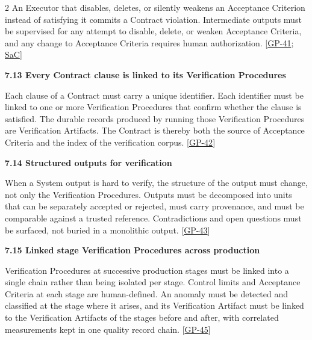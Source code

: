 \begin{multicols}{2}
An Executor that disables, deletes, or silently weakens an Acceptance Criterion instead of satisfying it commits a Contract violation. Intermediate outputs must be supervised for any attempt to disable, delete, or weaken Acceptance Criteria, and any change to Acceptance Criteria requires human authorization. [\hyperlink{gp-41}{GP-41}; \hyperlink{gp-SaC}{SaC}]

\hypertarget{nss-7.13}{}

\par\smallskip\noindent\textbf{7.13 Every Contract clause is linked to its Verification Procedures}\par\nopagebreak

Each clause of a Contract must carry a unique identifier. Each identifier must be linked to one or more Verification Procedures that confirm whether the clause is satisfied. The durable records produced by running those Verification Procedures are Verification Artifacts. The Contract is thereby both the source of Acceptance Criteria and the index of the verification corpus. [\hyperlink{gp-42}{GP-42}]

\hypertarget{nss-7.14}{}

\par\smallskip\noindent\textbf{7.14 Structured outputs for verification}\par\nopagebreak

When a System output is hard to verify, the structure of the output must change, not only the Verification Procedures. Outputs must be decomposed into units that can be separately accepted or rejected, must carry provenance, and must be comparable against a trusted reference. Contradictions and open questions must be surfaced, not buried in a monolithic output. [\hyperlink{gp-43}{GP-43}]

\hypertarget{nss-7.15}{}

\par\smallskip\noindent\textbf{7.15 Linked stage Verification Procedures across production}\par\nopagebreak

Verification Procedures at successive production stages must be linked into a single chain rather than being isolated per stage. Control limits and Acceptance Criteria at each stage are human-defined. An anomaly must be detected and classified at the stage where it arises, and its Verification Artifact must be linked to the Verification Artifacts of the stages before and after, with correlated measurements kept in one quality record chain. [\hyperlink{gp-45}{GP-45}]


\end{multicols}

